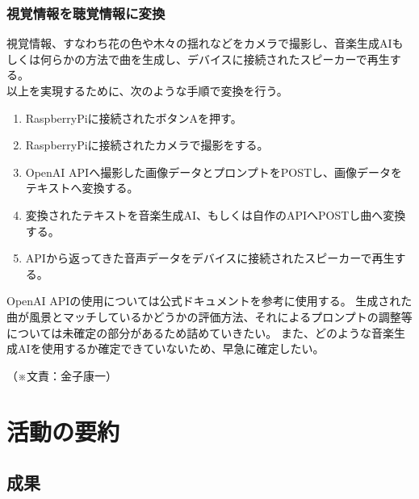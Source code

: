 \documentclass[12pt,a4paper]{report}
\newcommand{\Writer}[1]{
  \normalsize
  \begin{flushright}
    （※文責：#1）
  \end{flushright}
}
\begin{document}
\subsection{視覚情報を聴覚情報に変換}
\label{convertMusic}
\noindent\space
視覚情報、すなわち花の色や木々の揺れなどをカメラで撮影し、音楽生成AIもしくは何らかの方法で曲を生成し、デバイスに接続されたスピーカーで再生する。\\
以上を実現するために、次のような手順で変換を行う。
\begin{enumerate}
  \item RaspberryPiに接続されたボタンAを押す。
  \item RaspberryPiに接続されたカメラで撮影をする。
  \item OpenAI APIへ撮影した画像データとプロンプトをPOSTし、画像データをテキストへ変換する。
  \item 変換されたテキストを音楽生成AI、もしくは自作のAPIへPOSTし曲へ変換する。
  \item APIから返ってきた音声データをデバイスに接続されたスピーカーで再生する。
\end{enumerate} 
OpenAI APIの使用については公式ドキュメント\cite{OpenAIAPI}を参考に使用する。
生成された曲が風景とマッチしているかどうかの評価方法、それによるプロンプトの調整等については未確定の部分があるため詰めていきたい。
また、どのような音楽生成AIを使用するか確定できていないため、早急に確定したい。
\Writer{金子康一}

\chapter{活動の要約}
\section{成果}
\end{document}
